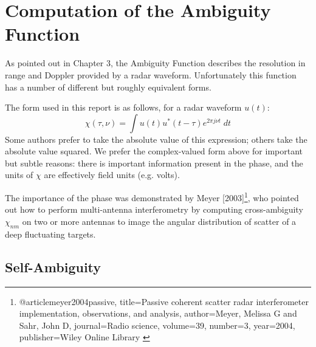 \chapter{Computation of the Ambiguity Function}
\label{s-ambiguity-function}

As pointed out in Chapter 3, the Ambiguity Function describes the resolution in range and Doppler 
provided by a radar waveform.  Unfortunately this function has a number of different but roughly 
equivalent forms.

The form used in this report is as follows, for a radar waveform $u(t)$:
\begin{equation}
\chi(\tau,\nu)  = \int u(t) u^\ast(t - \tau) e^{2 \pi j \nu t} \; dt
\end{equation}
Some authors prefer to take the absolute value of this expression; others take the absolute
value squared.  We prefer the complex-valued form above for  important but subtle reasons:
there is important information present in the phase, and the units of $\chi$ are effectively
field units (e.g. volts).

The importance of the phase was demonstrated by Meyer [2003]\footnote{@article{meyer2004passive,
  title={Passive coherent scatter radar interferometer implementation, observations, and analysis},
  author={Meyer, Melissa G and Sahr, John D},
  journal={Radio science},
  volume={39},
  number={3},
  year={2004},
  publisher={Wiley Online Library}
}}, who pointed out how to perform
multi-antenna interferometry by computing cross-ambiguity $\chi_{nm}$ on two or more antennas to 
image the angular distribution of scatter of a deep fluctuating targets.

\section{Self-Ambiguity}

